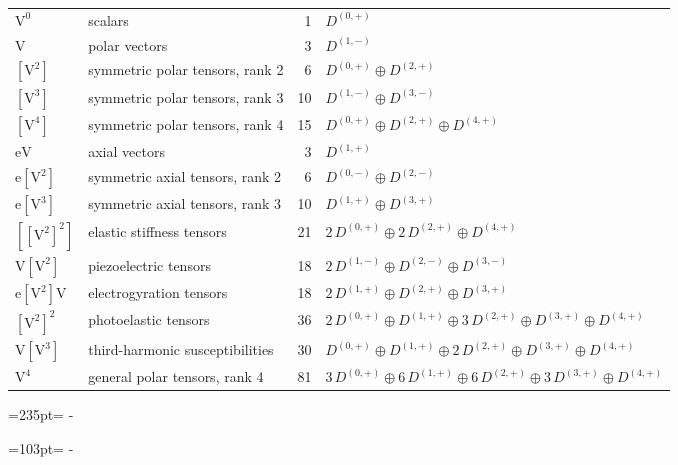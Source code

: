 \documentclass[10pt,a4paper]{article}
\newcommand{\needspace}[1]{\par\penalty-100\begingroup\dimen0=#1\relax\dimen2=\pagegoal
  \advance\dimen2-\pagetotal\ifdim\dimen0>\dimen2\relax\ifdim\dimen2>0pt\vfil\break\fi\fi
  \endgroup}
\numberwithin{equation}{section}
\newcommand{\irrJp}[2]{D^{(#1,#2)}}
\newcommand{\jahn}[1]{\mathrm{#1}}
\newlength{\fillwidth}\newlength{\cellwidth}\newlength{\colwidth}
\begin{document}
{\begin{longtable}{@{}llr>{\RaggedRight\arraybackslash}p{\fillwidth}@{}}
\bottomrule\endfoot\endlastfoot
$\jahn{V^{0}}$ & scalars & 1 & $\irrJp{0}{+}$\\*
$\jahn{V}$ & polar vectors & 3 & $\irrJp{1}{-}$\\
$\jahn{[V^{2}]}$ & symmetric polar tensors, rank 2 & 6 & $\irrJp{0}{+} \oplus\allowbreak \irrJp{2}{+}$\\
$\jahn{[V^{3}]}$ & symmetric polar tensors, rank 3 & 10 & $\irrJp{1}{-} \oplus\allowbreak \irrJp{3}{-}$\\
$\jahn{[V^{4}]}$ & symmetric polar tensors, rank 4 & 15 & $\irrJp{0}{+} \oplus\allowbreak \irrJp{2}{+} \oplus\allowbreak \irrJp{4}{+}$\\
$\jahn{eV}$ & axial vectors & 3 & $\irrJp{1}{+}$\\
$\jahn{e[V^{2}]}$ & symmetric axial tensors, rank 2 & 6 & $\irrJp{0}{-} \oplus\allowbreak \irrJp{2}{-}$\\
$\jahn{e[V^{3}]}$ & symmetric axial tensors, rank 3 & 10 & $\irrJp{1}{+} \oplus\allowbreak \irrJp{3}{+}$\\
$\jahn{[[V^{2}]^{2}]}$ & elastic stiffness tensors & 21 & $2\,\irrJp{0}{+} \oplus\allowbreak 2\,\irrJp{2}{+} \oplus\allowbreak \irrJp{4}{+}$\\
$\jahn{V[V^{2}]}$ & piezoelectric tensors & 18 & $2\,\irrJp{1}{-} \oplus\allowbreak \irrJp{2}{-} \oplus\allowbreak \irrJp{3}{-}$\\
$\jahn{e[V^{2}]V}$ & electrogyration tensors & 18 & $2\,\irrJp{1}{+} \oplus\allowbreak \irrJp{2}{+} \oplus\allowbreak \irrJp{3}{+}$\\
$\jahn{[V^{2}]^{2}}$ & photoelastic tensors & 36 & $2\,\irrJp{0}{+} \oplus\allowbreak \irrJp{1}{+} \oplus\allowbreak 3\,\irrJp{2}{+} \oplus\allowbreak \irrJp{3}{+} \oplus\allowbreak \irrJp{4}{+}$\\
$\jahn{V[V^{3}]}$ & third-harmonic susceptibilities & 30 & $\irrJp{0}{+} \oplus\allowbreak \irrJp{1}{+} \oplus\allowbreak 2\,\irrJp{2}{+} \oplus\allowbreak \irrJp{3}{+} \oplus\allowbreak \irrJp{4}{+}$\\*
$\jahn{V^{4}}$ & general polar tensors, rank 4 & 81 & $3\,\irrJp{0}{+} \oplus\allowbreak 6\,\irrJp{1}{+} \oplus\allowbreak 6\,\irrJp{2}{+} \oplus\allowbreak 3\,\irrJp{3}{+} \oplus\allowbreak \irrJp{4}{+}$\\
\bottomrule\end{longtable}}
\needspace{235pt}
\needspace{103pt}
\end{document}
